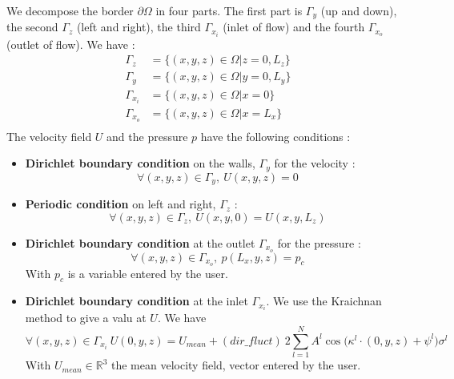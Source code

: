 We decompose the border $\partial \Omega$ in four parts. The first part is $\Gamma_y$ (up and down), the second $\Gamma_z$ (left and right), the third $\Gamma_{x_i}$ (inlet of flow) and the fourth $\Gamma_{x_o}$ (outlet of flow). We have :
\begin{align*}
\Gamma_z &= \{ (x,y,z) \in \Omega | z = 0, L_z \}\\
\Gamma_y &= \{ (x,y,z) \in \Omega | y = 0, L_y \}\\
\Gamma_{x_i} &= \{ (x,y,z) \in \Omega | x = 0\}\\
\Gamma_{x_o} &= \{ (x,y,z) \in \Omega | x = L_x \}\\
\end{align*}
The velocity field $U$ and the pressure $p$ have the following conditions :
\begin{itemize}
    \item \textbf{Dirichlet boundary condition} on the walls, $\Gamma_y$ for the velocity :
    \[
     \forall (x,y,z) \in \Gamma_y, \ U(x,y,z) = 0
    \]
    \item \textbf{Periodic condition} on left and right, $\Gamma_z$ :
    \[
     \forall (x,y,z) \in \Gamma_z, \ U(x,y,0) = U(x, y, L_z)
    \]
    \item \textbf{Dirichlet boundary condition} at the outlet $\Gamma_{x_o}$ for the pressure :
    \[
     \forall (x,y,z) \in \Gamma_{x_o}, \ p(L_x,y,z) = p_c
    \]
    With $p_c$ is a variable entered by the user.
    \item \textbf{Dirichlet boundary condition} at the inlet $\Gamma_{x_i}$. We use the Kraichnan method to give a valu at $U$. We have 
    \[
     \forall (x,y,z) \in \Gamma_{x_i} \ U(0,y,z) = U_{mean} + (dir\_fluct) \ 2\sum_{l=1}^{N} A^l \cos\big(\kappa^l \cdot (0,y,z)+ \psi^l \big) \sigma^l
    \]
With $U_{mean} \in \mathbb{R}^3$ the mean velocity field, vector entered by the user.
\end{itemize}
